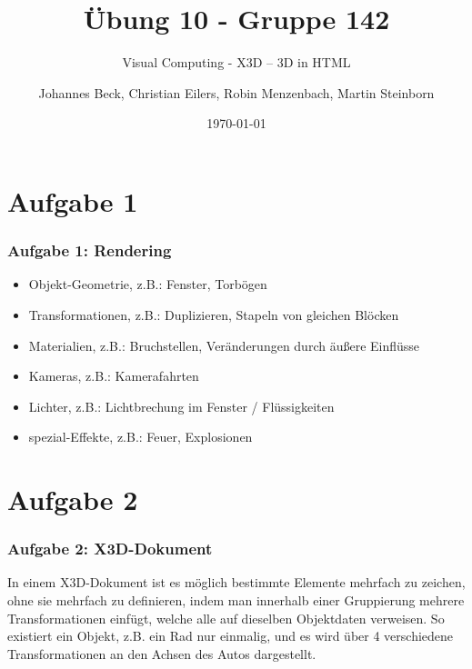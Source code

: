 \documentclass[accentcolor=tud9c,colorbacktitle,inverttitle,landscape,german,presentation,t]{tudbeamer}
\begin{document}
\title{\"Ubung 10 - Gruppe 142} 
\subtitle{Visual Computing - X3D – 3D in HTML} 

\author[Johannes Beck, Christian Eilers, Robin Menzenbach, Martin Steinborn]{Johannes Beck, Christian Eilers, Robin Menzenbach, Martin Steinborn}


\date{\today}

\begin{titleframe}
\end{titleframe}

\section{Aufgabe 1}
	\begin{frame}
		\frametitle{Aufgabe 1: Rendering}
		\begin{itemize}
			\item Objekt-Geometrie, z.B.: Fenster, Torbögen
			\item Transformationen, z.B.: Duplizieren, Stapeln von gleichen Blöcken
			\item Materialien, z.B.: Bruchstellen, Veränderungen durch äußere Einflüsse
			\item Kameras, z.B.: Kamerafahrten
			\item Lichter, z.B.: Lichtbrechung im Fenster / Flüssigkeiten
			\item spezial-Effekte, z.B.: Feuer, Explosionen
		\end{itemize}
	\end{frame}

\section{Aufgabe 2}
\begin{frame}
	\frametitle{Aufgabe 2: X3D-Dokument}
	In einem X3D-Dokument ist es möglich bestimmte Elemente mehrfach zu zeichen, ohne sie mehrfach zu definieren, indem man innerhalb einer Gruppierung mehrere Transformationen einfügt, welche alle auf dieselben Objektdaten verweisen. So existiert ein Objekt, z.B. ein Rad nur einmalig, und es wird über 4 verschiedene Transformationen an den Achsen des Autos dargestellt.
\end{frame}
\end{document}
